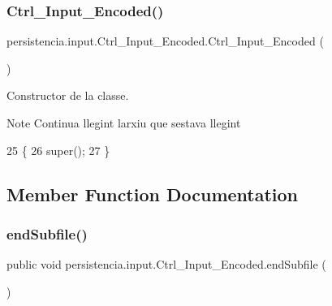 \subsubsection{\texorpdfstring{Ctrl\+\_\+\+Input\+\_\+\+Encoded()}{Ctrl\_Input\_Encoded()}\hspace{0.1cm}{\footnotesize\ttfamily [2/2]}}
{\footnotesize\ttfamily persistencia.\+input.\+Ctrl\+\_\+\+Input\+\_\+\+Encoded.\+Ctrl\+\_\+\+Input\+\_\+\+Encoded (\begin{DoxyParamCaption}{ }\end{DoxyParamCaption})\hspace{0.3cm}{\ttfamily [inline]}}



Constructor de la classe. 

\begin{DoxyNote}{Note}
Continua llegint l\textquotesingle{}arxiu que s\textquotesingle{}estava llegint 
\end{DoxyNote}

\begin{DoxyCode}
25                                 \{
26         super();
27     \}
\end{DoxyCode}


\subsection{Member Function Documentation}
\mbox{\label{classpersistencia_1_1input_1_1Ctrl__Input__Encoded_a180970a90ac6d386472e5959f7cf3f9b}} 
\subsubsection{\texorpdfstring{end\+Subfile()}{endSubfile()}}
{\footnotesize\ttfamily public void persistencia.\+input.\+Ctrl\+\_\+\+Input\+\_\+\+Encoded.\+end\+Subfile (\begin{DoxyParamCaption}{ }\end{DoxyParamCaption})\hspace{0.3cm}{\ttfamily [inline]}}



